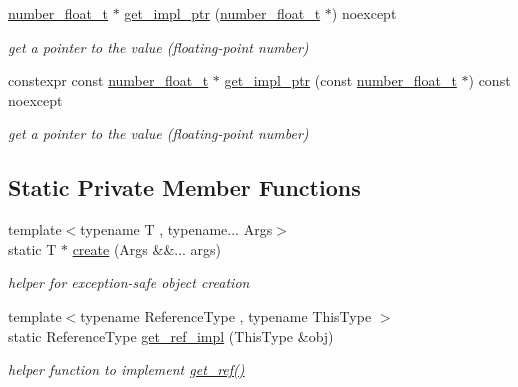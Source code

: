\begin{DoxyCompactItemize}
\hyperlink{classnlohmann_1_1basic__json_a88d6103cb3620410b35200ee8e313d97}{number\+\_\+float\+\_\+t} $\ast$ \hyperlink{classnlohmann_1_1basic__json_a01e81365c2c6897b39b793530e02aca5}{get\+\_\+impl\+\_\+ptr} (\hyperlink{classnlohmann_1_1basic__json_a88d6103cb3620410b35200ee8e313d97}{number\+\_\+float\+\_\+t} $\ast$) noexcept
\begin{DoxyCompactList}\small\item\em get a pointer to the value (floating-\/point number) \end{DoxyCompactList}\item 
constexpr const \hyperlink{classnlohmann_1_1basic__json_a88d6103cb3620410b35200ee8e313d97}{number\+\_\+float\+\_\+t} $\ast$ \hyperlink{classnlohmann_1_1basic__json_abbec23daef5fbb5b8bff6a481e5a7160}{get\+\_\+impl\+\_\+ptr} (const \hyperlink{classnlohmann_1_1basic__json_a88d6103cb3620410b35200ee8e313d97}{number\+\_\+float\+\_\+t} $\ast$) const noexcept
\begin{DoxyCompactList}\small\item\em get a pointer to the value (floating-\/point number) \end{DoxyCompactList}\end{DoxyCompactItemize}
\subsection*{Static Private Member Functions}
\begin{DoxyCompactItemize}
\item 
{\footnotesize template$<$typename T , typename... Args$>$ }\\static T $\ast$ \hyperlink{classnlohmann_1_1basic__json_a81100399cf3e2be457937be7db3f5729}{create} (Args \&\&... args)
\begin{DoxyCompactList}\small\item\em helper for exception-\/safe object creation \end{DoxyCompactList}\item 
{\footnotesize template$<$typename Reference\+Type , typename This\+Type $>$ }\\static Reference\+Type \hyperlink{classnlohmann_1_1basic__json_a040a5feb1eb48da9134924217b25bcf6}{get\+\_\+ref\+\_\+impl} (This\+Type \&obj)
\begin{DoxyCompactList}\small\item\em helper function to implement \hyperlink{classnlohmann_1_1basic__json_afbd800010b67619463c0fce6e74f7878}{get\+\_\+ref()} \end{DoxyCompactList}\end{DoxyCompactItemize}
